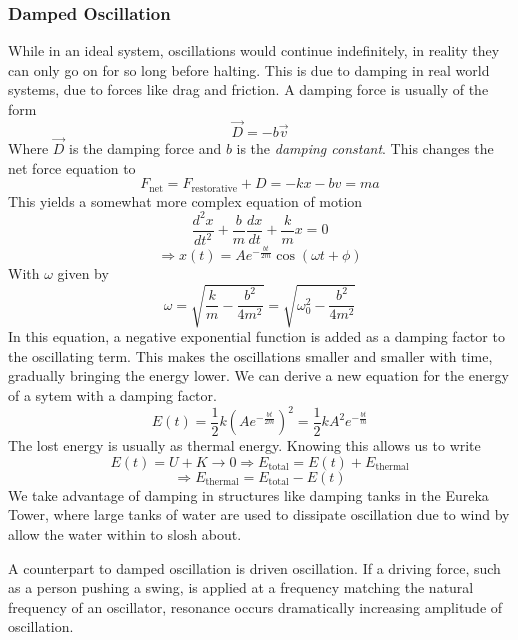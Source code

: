 \documentclass[12pt]{report}
\begin{document}
\begin{flushleft}
\subsubsection*{Damped Oscillation}
While in an ideal system, oscillations would continue indefinitely, in reality
they can only go on for so long before halting. This is due to damping in
real world systems, due to forces like drag and friction. A damping force
is usually of the form
\[\vec{D} = -b\vec{v}\]
Where \(\vec{D}\) is the damping force and \(b\) is the \textit{damping
constant}. This changes the net force equation to
\[F_\mathrm{net} = F_\mathrm{restorative} + D = -kx - bv = ma\]
This yields a somewhat more complex equation of motion
\[\frac{d^2x}{dt^2} + \frac{b}{m}\frac{dx}{dt} + \frac{k}{m}x = 0\]
\[\Rightarrow x(t) = Ae^{-\frac{bt}{2m}}\cos(\omega t + \phi)\]
With \(\omega\) given by
\[\omega = \sqrt{\frac{k}{m} - \frac{b^2}{4m^2}} 
= \sqrt{\omega_0^2 - \frac{b^2}{4m^2}}\]
In this equation, a negative exponential function is added as a damping factor
to the oscillating term. This makes the oscillations smaller and smaller with
time, gradually bringing the energy lower. We can derive a new equation for
the energy of a sytem with a damping factor.
\[E(t) = \frac{1}{2}k\left(Ae^{-\frac{bt}{2m}}\right)^2 
= \frac{1}{2}kA^2e^{-\frac{bt}{m}}\]
The lost energy is usually as thermal energy. Knowing this allows us to write
\[E(t) = U + K \rightarrow 0 \Rightarrow 
E_\mathrm{total} = E(t) + E_\mathrm{thermal}\]
\[\Rightarrow E_\mathrm{thermal} = E_\mathrm{total} - E(t)\]
We take advantage of damping in structures like damping tanks in the Eureka
Tower, where large tanks of water are used to dissipate oscillation due to wind
by allow the water within to slosh about.

\bigskip
A counterpart to damped oscillation is driven oscillation. If a driving
force, such as a person pushing a swing, is applied at a frequency matching
the natural frequency of an oscillator, resonance occurs dramatically 
increasing amplitude of oscillation.


\end{flushleft}
\end{document}
